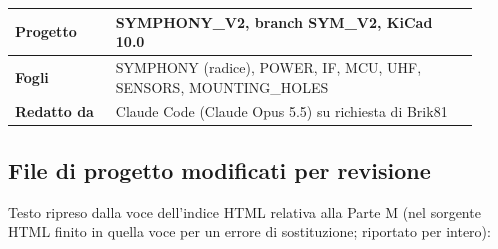 {\begin{longtable}{>{\raggedright\arraybackslash}p{0.2\linewidth}>{\raggedright\arraybackslash}p{0.72\linewidth}}
\textbf{Progetto} & SYMPHONY\_\allowbreak{}V2, branch SYM\_\allowbreak{}V2, KiCad 10.0 \\
\midrule[0.15pt]

\textbf{Fogli} & SYMPHONY (radice), POWER, IF, MCU, UHF, SENSORS, MOUNTING\_\allowbreak{}HOLES \\
\midrule[0.15pt]

\textbf{Redatto da} & Claude Code (Claude Opus 5.5) su richiesta di Brik81 \\
\midrule[0.15pt]

\bottomrule
\end{longtable}}

\subsection[File di progetto modificati per revisione]{File di progetto modificati per revisione}

{\small Testo ripreso dalla voce dell'indice HTML relativa alla Parte M (nel sorgente HTML finito in quella voce per un errore di sostituzione; riportato per intero):}


